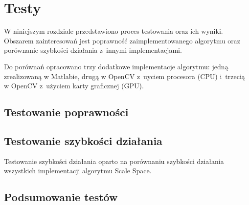 \chapter{Testy}
\label{cha:testy}

W niniejszym rozdziale przedstawiono proces testowania oraz ich wyniki. Obszarem zainteresowań jest poprawność zaimplementowanego algorytmu oraz porównanie szybkości działania z~innymi implementacjami.

Do porównań opracowano trzy dodatkowe implementacje algorytmu: jedną zrealizowaną w Matlabie, drugą w OpenCV z~uyciem procesora (CPU) i~trzecią w OpenCV z~użyciem karty graficznej (GPU).

\section{Testowanie poprawności}
\label{sec:testPoprawnosc}


\section{Testowanie szybkości działania}
\label{sec:testSzybkosc1}

Testowanie szybkości działania oparto na porównaniu szybkości działania wszystkich implementacji algorytmu Scale Space.


\section{Podsumowanie testów}
\label{sec:testPodsumowanie}

